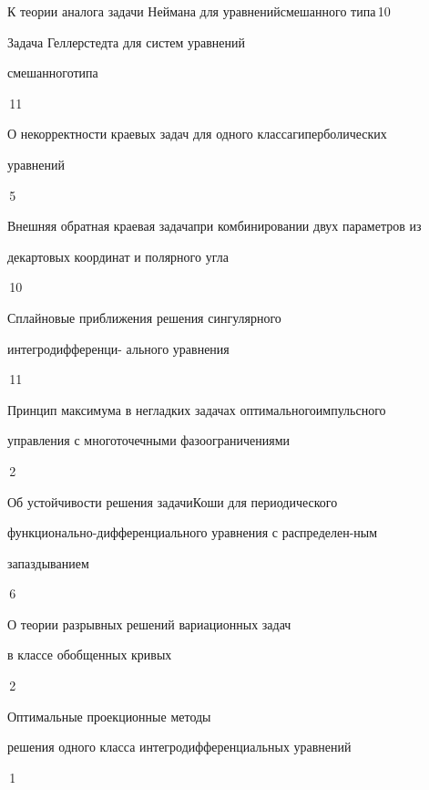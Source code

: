 

{К теории аналога задачи Неймана для уравнений\newline смешанного типа}{\No\,10}




{Задача Геллерстедта для систем уравнений


смешанного\newline типа}{\No\,11}




{О некорректности краевых задач для одного класса\newline гиперболических


уравнений}{\No\,5}




{Внешняя обратная краевая задача\newline при комбинировании двух параметров из


декартовых координат и полярного угла}{\No\,10}




{Сплайновые приближения решения сингулярного 


интегродифференци- \newline ального уравнения}{\No\,11}




{Принцип максимума в негладких задачах оптимального\newline импульсного


управления с многоточечными фазоограничениями}{\No\,2}




{Об устойчивости решения задачи\newline Коши для периодического


функционально-дифференциального уравнения с распределен-\newline ным


запаздыванием}{\No\,6}




{О теории разрывных решений вариационных задач \newline


в классе обобщенных кривых}{\No\,2}




{Оптимальные проекционные методы\newline


решения одного класса интегродифференциальных уравнений}{\No\,1}


